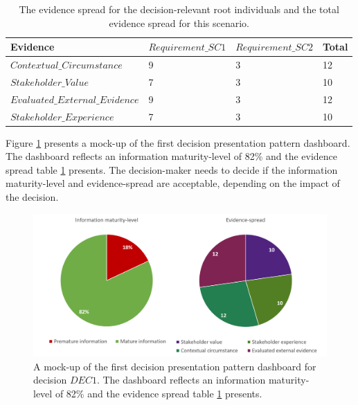 \begin{table}[H]
\centering
\caption{The evidence spread for the decision-relevant root individuals and the total evidence spread for this scenario.}
\begin{tabular}{| p{5cm} | p{4cm} |  p{4cm} |  p{2cm} | }
\hline
\rowcolor{document}
\color{documentText}Evidence &\color{documentText}$Requirement\_SC1$ & \color{documentText}$Requirement\_SC2$ & \color{documentText}Total \\
\hline
$Contextual\_Circumstance$ & 9 & 3 & 12 \\
\hdashline
$Stakeholder\_Value$ & 7 & 3 & 10 \\
\hdashline
$Evaluated\_External\_Evidence$ & 9 & 3 & 12 \\
\hdashline
$Stakeholder\_Experience$ & 7 & 3 & 10 \\
\hline
\end{tabular}
\label{table:rp_evidence_spread_SC1}
\end{table}

Figure \ref{fig:05_RP_Dashboard_Component_1_RP_SC1} presents a mock-up of the first decision presentation pattern dashboard. The dashboard reflects an information maturity-level of 82\% and the evidence spread table \ref{table:rp_evidence_spread_SC1} presents. The decision-maker needs to decide if the information maturity-level and evidence-spread are acceptable, depending on the impact of the decision.

\begin{figure}[H]
\centering
  \includegraphics[width=14cm]{../../Images/05_Validation/05_RP_Dashboard_Component_1_RP_SC1.png}
  \caption{A mock-up of the first decision presentation pattern dashboard for decision $DEC1$. The dashboard reflects an information maturity-level of 82\% and the evidence spread table \ref{table:rp_evidence_spread_SC1} presents.}
  \label{fig:05_RP_Dashboard_Component_1_RP_SC1}
\end{figure}

